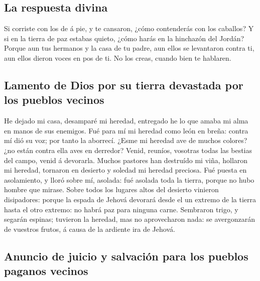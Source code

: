 \hypertarget{la-respuesta-divina}{%
\subsection{La respuesta divina}\label{la-respuesta-divina}}

 Si corriste con los de á pie, y te cansaron, ¿cómo
contenderás con los caballos? Y si en la tierra de paz estabas quieto,
¿cómo harás en la hinchazón del Jordán?  Porque aun tus
hermanos y la casa de tu padre, aun ellos se levantaron contra ti, aun
ellos dieron voces en pos de ti. No los creas, cuando bien te hablaren.

\hypertarget{lamento-de-dios-por-su-tierra-devastada-por-los-pueblos-vecinos}{%
\subsection{Lamento de Dios por su tierra devastada por los pueblos
vecinos}\label{lamento-de-dios-por-su-tierra-devastada-por-los-pueblos-vecinos}}

 He dejado mi casa, desamparé mi heredad, entregado he lo
que amaba mi alma en manos de sus enemigos.  Fué para mí mi
heredad como león en breña: contra mí dió su voz; por tanto la aborrecí.
 ¿Esme mi heredad ave de muchos colores? ¿no están contra
ella aves en derredor? Venid, reuníos, vosotras todas las bestias del
campo, venid á devorarla.  Muchos pastores han destruído mi
viña, hollaron mi heredad, tornaron en desierto y soledad mi heredad
preciosa.  Fué puesta en asolamiento, y lloró sobre mí,
asolada: fué asolada toda la tierra, porque no hubo hombre que mirase.
 Sobre todos los lugares altos del desierto vinieron
disipadores: porque la espada de Jehová devorará desde el un extremo de
la tierra hasta el otro extremo: no habrá paz para ninguna carne.
 Sembraron trigo, y segarán espinas; tuvieron la heredad,
mas no aprovecharon nada: se avergonzarán de vuestros frutos, á causa de
la ardiente ira de Jehová.

\hypertarget{anuncio-de-juicio-y-salvaciuxf3n-para-los-pueblos-paganos-vecinos}{%
\subsection{Anuncio de juicio y salvación para los pueblos paganos
vecinos}\label{anuncio-de-juicio-y-salvaciuxf3n-para-los-pueblos-paganos-vecinos}}

